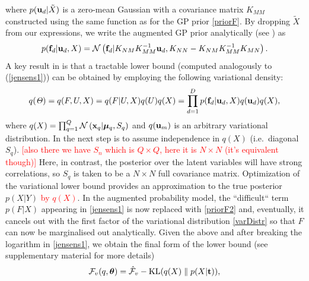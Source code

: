 \documentclass{article} %
\begin{document}
where $p(\mathbf{u}_d | \tilde{X})$ is a zero-mean Gaussian with a
covariance matrix $K_{MM}$ constructed using the same function as for
the GP prior \eqref{priorF}. By dropping $\tilde{X}$ from our
expressions, we write the augmented GP prior analytically (see
\cite{rasmussen-williams}) as
\begin{equation}
 \label{priorF2}
p(\mathbf{f}_d | \mathbf{u}_d, X) =  \mathcal{N}  \left( \mathbf{f}_d | K_{NM} K_{MM}^{-1} \mathbf{u}_d , K_{NN} - K_{NM} K_{MM}^{-1} K_{MN} \right).
\end{equation}
A key result in \cite{BayesianGPLVM}
 is that a tractable lower bound 
(computed analogously to (\ref{jensens1})) can be obtained by employing the following variational density:
\begin{equation}
\label{varDistr}
q(\mathit{\Theta}) = q(F, U,X) = q(F | U, X) q(U) q(X) = \prod_{d=1}^D p(\mathbf{f}_d | \mathbf{u}_d, X )q(\mathbf{u}_d) q(X),
\end{equation}
%
where $q(X) = \prod_{q=1}^Q \mathcal{N} \left( \mathbf{x}_q | \boldsymbol \mu_q, S_q
\right)$ and $q(\mathbf{u}_m)$ is an arbitrary variational distribution. 
In  \cite{BayesianGPLVM} the next step is to assume
independence in $q(X)$ (i.e.\ diagonal $S_q$). 
\textcolor{red}{[also there we have $S_n$ which is $Q \times Q$, here it is $N \times N$ (it's equivalent though)]}
Here, in contrast, 
the posterior over the latent variables will have strong correlations, 
so $S_q$ is taken to be a $N \times N$ full covariance
matrix. Optimization of the variational lower bound provides 
an approximation to the true posterior $p(X|Y)$ \textcolor{red}{by $q(X)$}.
%
In the augmented probability model, the ``difficult`` term $p(F | X)$ appearing in \eqref{jensens1} is now replaced with \eqref{priorF2} and, eventually, it cancels out with the first factor of the variational distribution \eqref{varDistr} so that $F$ can now be marginalised out analytically.
% 
%
 Given the above and after breaking the logarithm in \eqref{jensens1}, we obtain the final form of the lower bound (see supplementary material for more details)
%
\begin{equation}
\label{jensens}
\mathcal{F}_v(q, \boldsymbol \theta) = 
\hat{\mathcal{F}}_v - \text{KL}(q(X) \parallel p(X|\mathbf{t})),
\end{equation}
\end{document}
